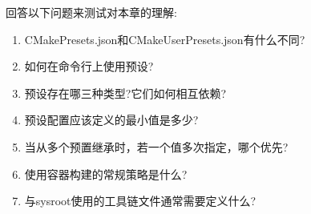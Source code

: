 回答以下问题来测试对本章的理解:

\begin{enumerate}
\item 
CMakePresets.json和CMakeUserPresets.json有什么不同?

\item 
如何在命令行上使用预设?

\item 
预设存在哪三种类型?它们如何相互依赖?

\item 
预设配置应该定义的最小值是多少?

\item 
当从多个预置继承时，若一个值多次指定，哪个优先?

\item 
使用容器构建的常规策略是什么?

\item 
与sysroot使用的工具链文件通常需要定义什么?
\end{enumerate}